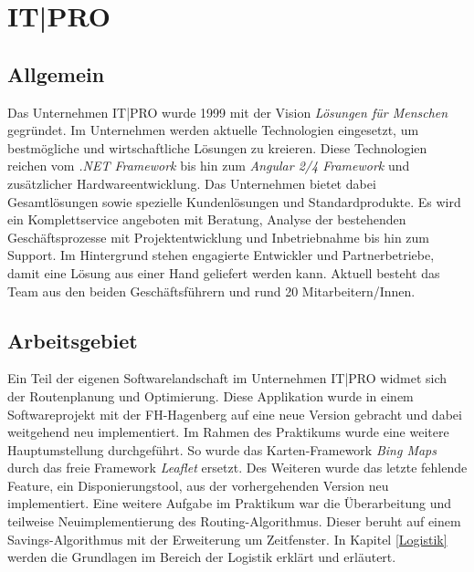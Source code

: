 \chapter{IT|PRO}
\label{IT|PRO}

\section{Allgemein}

Das Unternehmen IT|PRO wurde 1999 mit der Vision \textit{Lösungen für Menschen} gegründet. 
Im Unternehmen werden aktuelle Technologien eingesetzt, um bestmögliche und wirtschaftliche Lösungen zu kreieren. 
Diese Technologien reichen vom \textit{.NET Framework} bis hin zum \textit{Angular 2/4 Framework} und zusätzlicher Hardwareentwicklung. 
Das Unternehmen bietet dabei Gesamtlösungen sowie spezielle Kundenlösungen und Standardprodukte. 
Es wird ein Komplettservice angeboten mit Beratung, Analyse der bestehenden Geschäftsprozesse mit Projektentwicklung und Inbetriebnahme bis hin zum Support. 
Im Hintergrund stehen engagierte Entwickler und Partnerbetriebe, damit eine Lösung aus einer Hand geliefert werden kann. 
Aktuell besteht das Team aus den beiden Geschäftsführern und rund 20 Mitarbeitern/Innen. 

\section{Arbeitsgebiet}


Ein Teil der eigenen Softwarelandschaft im Unternehmen IT|PRO widmet sich der Routenplanung und Optimierung. 
Diese Applikation wurde in einem Softwareprojekt mit der FH-Hagenberg auf eine neue Version gebracht und dabei weitgehend neu implementiert. 
Im Rahmen des Praktikums wurde eine weitere Hauptumstellung durchgeführt. 
So wurde das Karten-Framework \textit{Bing Maps} durch das freie Framework \textit{Leaflet} ersetzt. 
Des Weiteren wurde das letzte fehlende Feature, ein Disponierungstool, aus der vorhergehenden Version neu implementiert. 
Eine weitere Aufgabe im Praktikum war die Überarbeitung und teilweise Neuimplementierung des Routing-Algorithmus. 
Dieser beruht auf einem Savings-Algorithmus mit der Erweiterung um Zeitfenster. 
In Kapitel \ref{Logistik} werden die Grundlagen im Bereich der Logistik erklärt und erläutert. 
